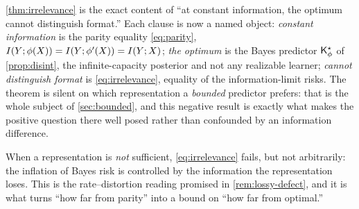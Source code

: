 \begin{remark}
\label{rem:slogan}
\cref{thm:irrelevance} is the exact content of ``at constant information, the
optimum cannot distinguish format.'' Each clause is now a named object:
\emph{constant information} is the parity equality \eqref{eq:parity},
$I(Y ; \phi(X)) = I(Y ; \phi'(X)) = I(Y ; X)$; \emph{the optimum} is the
Bayes predictor $\mathsf{K}^{\star}_{\phi}$ of \cref{prop:disint}, the infinite-capacity
posterior and not any realizable learner; \emph{cannot distinguish format} is
\eqref{eq:irrelevance}, equality of the information-limit risks. The theorem is
silent on which representation a \emph{bounded} predictor prefers: that is the
whole subject of \cref{sec:bounded}, and this negative result is exactly what
makes the positive question there well posed rather than confounded by an
information difference.
\end{remark}

When a representation is \emph{not} sufficient, \eqref{eq:irrelevance} fails,
but not arbitrarily: the inflation of Bayes risk is controlled by the
information the representation loses. This is the rate--distortion reading
promised in \cref{rem:lossy-defect}, and it is what turns ``how far from
parity'' into a bound on ``how far from optimal.''

